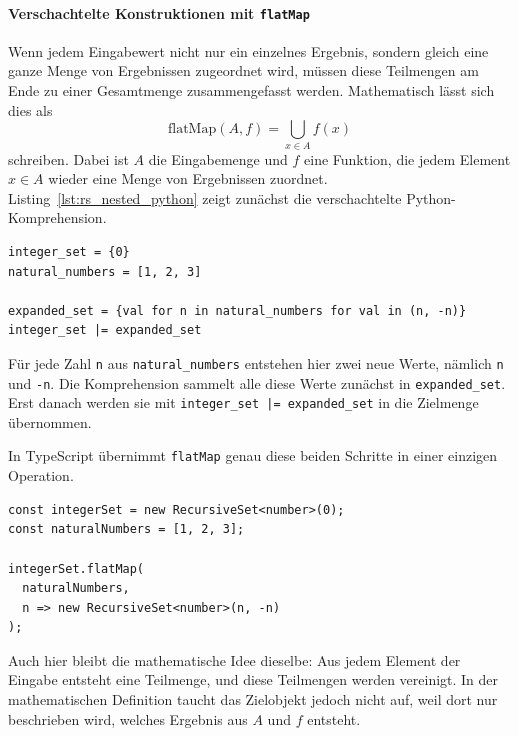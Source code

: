 \paragraph{Verschachtelte Konstruktionen mit \texttt{flatMap}}
Wenn jedem Eingabewert nicht nur ein einzelnes Ergebnis, sondern gleich eine ganze Menge von Ergebnissen zugeordnet wird, müssen diese Teilmengen am Ende zu einer Gesamtmenge zusammengefasst werden. Mathematisch lässt sich dies als
\[
\mathrm{flatMap}(A, f) = \bigcup_{x \in A} f(x)
\]
schreiben. Dabei ist \(A\) die Eingabemenge und \(f\) eine Funktion, die jedem Element \(x \in A\) wieder eine Menge von Ergebnissen zuordnet. Listing~\ref{lst:rs_nested_python} zeigt zunächst die verschachtelte Python-Komprehension.

\begin{listing}[ht]
    \caption{Python: Verschachtelte Mengenkomprehension}
    \label{lst:rs_nested_python}
    \begin{verbatim}
integer_set = {0}
natural_numbers = [1, 2, 3]

expanded_set = {val for n in natural_numbers for val in (n, -n)}
integer_set |= expanded_set
    \end{verbatim}
\end{listing}

Für jede Zahl \texttt{n} aus \texttt{natural_numbers} entstehen hier zwei neue Werte, nämlich \texttt{n} und \texttt{-n}. Die Komprehension sammelt alle diese Werte zunächst in \texttt{expanded_set}. Erst danach werden sie mit \texttt{integer_set |= expanded_set} in die Zielmenge übernommen.

In TypeScript übernimmt \texttt{flatMap} genau diese beiden Schritte in einer einzigen Operation.

\begin{listing}[ht]
    \caption{Verschachtelte Konstruktion mit \texttt{flatMap}}
    \label{lst:rs_flatmap_ts}
    \begin{verbatim}
const integerSet = new RecursiveSet<number>(0);
const naturalNumbers = [1, 2, 3];

integerSet.flatMap(
  naturalNumbers,
  n => new RecursiveSet<number>(n, -n)
);
    \end{verbatim}
\end{listing}

Auch hier bleibt die mathematische Idee dieselbe: Aus jedem Element der Eingabe entsteht eine Teilmenge, und diese Teilmengen werden vereinigt. In der mathematischen Definition taucht das Zielobjekt jedoch nicht auf, weil dort nur beschrieben wird, welches Ergebnis aus \(A\) und \(f\) entsteht.

